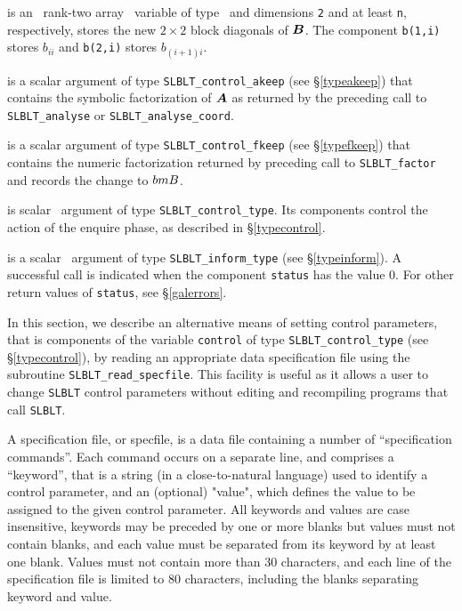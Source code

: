 \documentclass{galahad}
\newcommand{\packagename}{SLBLT}
\begin{document}
\begin{description}
 is an \optional\ rank-two array \intentout\ variable of type \realdp\ 
and dimensions {\tt 2} and at least {\tt n}, respectively,
stores the new $2\times2$ block diagonals of ${\bm{B}}$. The component
{\tt b(1,i)} stores $b_{ii}$ and {\tt b(2,i)} stores $b_{(i+1)i}$.

 is a scalar \intentin argument of type
{\tt \packagename\_control\_akeep} (see \S\ref{typeakeep}) that contains the 
symbolic factorization of ${\bm{A}}$ as returned by the preceding call
to {\tt \packagename\_analyse} or {\tt \packagename\_analyse\_coord}.

 is a scalar \intentinout argument of type
{\tt \packagename\_control\_fkeep} (see \S\ref{typefkeep}) that contains the 
numeric factorization returned by preceding call to {\tt \packagename\_factor}
and records the change to $\\bmB$.

 is scalar \intentin\ argument of type
{\tt \packagename\_control\_type}. Its components control the action
of the enquire phase, as described in \S\ref{typecontrol}.

 is a scalar \intentinout\ argument of type
{\tt \packagename\_inform\_type} (see \S\ref{typeinform}).
A successful call is indicated when the  component {\tt status} has the value 0.
For other return values of {\tt status}, see \S\ref{galerrors}.

\end{description}


\galcontrolfeatures
\noindent In this section, we describe an alternative means of setting
control parameters, that is components of the variable {\tt control} of type
{\tt \packagename\_control\_type}
(see \S\ref{typecontrol}),
by reading an appropriate data specification file using the
subroutine {\tt \packagename\_read\_specfile}. This facility
is useful as it allows a user to change  {\tt \packagename} control parameters
without editing and recompiling programs that call {\tt \packagename}.

A specification file, or specfile, is a data file containing a number of
``specification commands''. Each command occurs on a separate line,
and comprises a ``keyword'',
that is a string (in a close-to-natural language) used to identify a
control parameter, and
an (optional) "value", which defines the value to be assigned to the given
control parameter. All keywords and values are case insensitive,
keywords may be preceded by one or more blanks but
values must not contain blanks, and
each value must be separated from its keyword by at least one blank.
Values must not contain more than 30 characters, and
each line of the specification file is limited to 80 characters,
including the blanks separating keyword and value.
\end{document}
